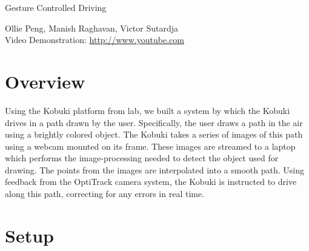 \documentclass[10pt]{article}
\newenvironment{Figure}
  {\par\medskip\noindent\minipage{\linewidth}}
  {\endminipage\par\medskip}
\def\videolink{\url{http://www.youtube.com}}
\begin{document}
\begin{center}
  \Large Gesture Controlled Driving
\end{center}
\begin{center}
  Ollie Peng, Manish Raghavan, Victor Sutardja \\
  Video Demonstration: \videolink{}
\end{center}
\begin{multicols*}{2}
  \section*{Overview}
  Using the Kobuki platform from lab, we built a system by which the Kobuki
  drives in a path drawn by the user. Specifically, the user draws a path in the
  air using a brightly colored object. The Kobuki takes a series of images of
  this path using a webcam mounted on its frame. These images are streamed to a
  laptop which performs the image-processing needed to detect the object used
  for drawing. The points from the images are interpolated into a smooth path.
  Using feedback from the OptiTrack camera system, the Kobuki is instructed to
  drive along this path, correcting for any errors in real time.

  \section*{Setup}
  \begin{Figure}
     \label{fig:info}
  \end{Figure}


\end{multicols*}
\end{document}
